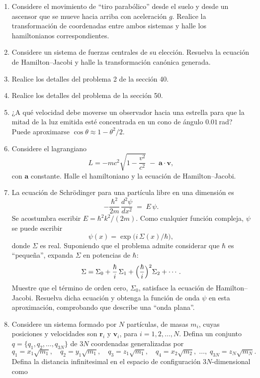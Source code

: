 \documentclass[12pt]{article}
\begin{document}
\begin{enumerate}
  \item Considere el movimiento de “tiro parabólico” desde el suelo y desde un ascensor que se mueve hacia arriba con aceleración \(g\). Realice la transformación de coordenadas entre ambos sistemas y halle los hamiltonianos correspondientes.
  \item Considere un sistema de fuerzas centrales de su elección. Resuelva la ecuación de Hamilton–Jacobi y halle la transformación canónica generada.
  \item Realice los detalles del problema 2 de la sección 40.
  \item Realice los detalles del problema de la sección 50.
  \item ¿A qué velocidad debe moverse un observador hacia una estrella para que la mitad de la luz emitida esté concentrada en un cono de ángulo \(0.01\)\,rad? Puede aproximarse \(\cos\theta\approx1-\theta^2/2\).
  \item Considere el lagrangiano
    \[
      L = -mc^2\sqrt{1-\frac{v^2}{c^2}} \;-\; \mathbf a\cdot\mathbf v,
    \]
    con \(\mathbf a\) constante. Halle el hamiltoniano y la ecuación de Hamilton–Jacobi.
  \item La ecuación de Schrödinger para una partícula libre en una dimensión es
    \[
      -\frac{\hbar^2}{2m}\,\frac{d^2\psi}{dx^2} \;=\; E\,\psi.
    \]
    Se acostumbra escribir \(E=\hbar^2k^2/(2m)\). Como cualquier función compleja, \(\psi\) se puede escribir
    \[
      \psi(x) = \exp\!\bigl(i\,\Sigma(x)/\hbar\bigr),
    \]
    donde \(\Sigma\) es real. Suponiendo que el problema admite considerar que \(\hbar\) es “pequeña”, expanda \(\Sigma\) en potencias de \(\hbar\):
    \[
      \Sigma = \Sigma_0 + \frac{\hbar}{i}\,\Sigma_1 + \Bigl(\frac{\hbar}{i}\Bigr)^2 \Sigma_2 + \cdots.
    \]
    Muestre que el término de orden cero, \(\Sigma_0\), satisface la ecuación de Hamilton–Jacobi. Resuelva dicha ecuación y obtenga la función de onda \(\psi\) en esta aproximación, comprobando que describe una “onda plana”.
  \item Considere un sistema formado por \(N\) partículas, de masas \(m_i\), cuyas posiciones y velocidades son \(\mathbf{r}_i\) y \(\mathbf{v}_i\), para \(i=1,2,\dots,N\). Defina un conjunto \(q=\{q_1,q_2,\dots,q_{3N}\}\) de \(3N\) coordenadas generalizadas por
    \[
      q_1 = x_1\sqrt{m_1},\quad
      q_2 = y_1\sqrt{m_1},\quad
      q_3 = z_1\sqrt{m_1},\quad
      q_4 = x_2\sqrt{m_2},\;\dots,\;
      q_{3N} = z_N\sqrt{m_N}.
    \]
    Defina la distancia infinitesimal en el espacio de configuración \(3N\)-dimensional como

\end{enumerate}
\end{document}
